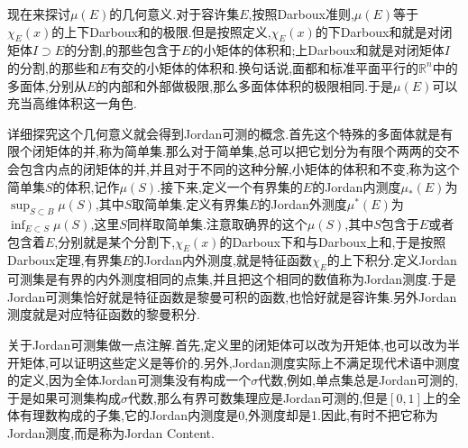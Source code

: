 现在来探讨$\mu(E)$的几何意义.对于容许集$E$,按照Darboux准则,$\mu(E)$等于$\chi_E(x)$的上下Darboux和的极限.但是按照定义,$\chi_E(x)$的下Darboux和就是对闭矩体$I\supset E$的分割,的那些包含于$E$的小矩体的体积和;上Darboux和就是对闭矩体$I$的分割,的那些和$E$有交的小矩体的体积和.换句话说,面都和标准平面平行的$\mathbb{R}^n$中的多面体,分别从$E$的内部和外部做极限,那么多面体体积的极限相同.于是$\mu(E)$可以充当高维体积这一角色.

详细探究这个几何意义就会得到Jordan可测的概念.首先这个特殊的多面体就是有限个闭矩体的并,称为简单集.那么对于简单集,总可以把它划分为有限个两两的交不会包含内点的闭矩体的并,并且对于不同的这种分解,小矩体的体积和不变,称为这个简单集$S$的体积,记作$\mu(S)$.接下来,定义一个有界集的$E$的Jordan内测度$\mu_*(E)$为$\sup_{S\subset B}\mu(S)$,其中$S$取简单集.定义有界集$E$的Jordan外测度$\mu^*(E)$为$\inf_{E\subset S}\mu(S)$,这里$S$同样取简单集.注意取确界的这个$\mu(S)$,其中$S$包含于$E$或者包含着$E$,分别就是某个分割下,$\chi_E(x)$的Darboux下和与Darboux上和,于是按照Darboux定理,有界集$E$的Jordan内外测度,就是特征函数$\chi_E$的上下积分.定义Jordan可测集是有界的内外测度相同的点集,并且把这个相同的数值称为Jordan测度.于是Jordan可测集恰好就是特征函数是黎曼可积的函数,也恰好就是容许集.另外Jordan测度就是对应特征函数的黎曼积分.

关于Jordan可测集做一点注解.首先,定义里的闭矩体可以改为开矩体,也可以改为半开矩体,可以证明这些定义是等价的.另外,Jordan测度实际上不满足现代术语中测度的定义,因为全体Jordan可测集没有构成一个$\sigma$代数,例如,单点集总是Jordan可测的,于是如果可测集构成$\sigma$代数,那么有界可数集理应是Jordan可测的,但是$[0,1]$上的全体有理数构成的子集,它的Jordan内测度是0,外测度却是1.因此,有时不把它称为Jordan测度,而是称为Jordan Content.

